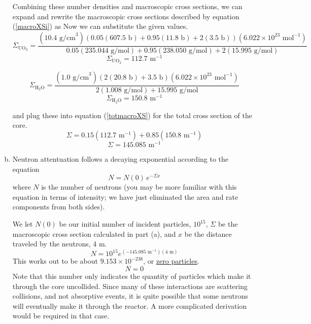 \documentclass{report}
\begin{document}
\begin{enumerate}[a)]
Combining these number densities and macroscopic cross sections, we can expand and rewrite the macroscopic cross sections described by equation (\ref{macroXSi}) as
Now we can substitute the given values. 
$$ \Sigma_{\text{UO}_2} = \frac{\left(10.4\text{ g/cm}^3\right) \left(0.05(607.5\text{ b}) + 0.95(11.8\text{ b})  + 2(3.5\text{ b})\right)\left(6.022\times10^{23}\text{ mol}^{-1}\right)}{0.05(235.044\text{ g/mol}) + 0.95(238.050\text{ g/mol}) + 2(15.995\text{ g/mol})} $$
$$ \Sigma_{\text{UO}_2} = 112.7\text{ m}^{-1} $$

$$ \Sigma_{\text{H}_2\text{O}} = \frac{\left(1.0\text{ g/cm}^3\right) \left(2(20.8\text{ b}) + 3.5\text{ b}\right) \left(6.022\times10^{23}\text{ mol}^{-1}\right)}{2(1.008\text{ g/mol}) + 15.995\text{ g/mol}} $$
$$ \Sigma_{\text{H}_2\text{O}} = 150.8\text{ m}^{-1} $$

and plug these into equation (\ref{totmacroXS}) for the total cross section of the core.
$$ \Sigma = 0.15(112.7\text{ m}^{-1}) + 0.85(150.8\text{ m}^{-1})
 $$
$$\boxed{ \Sigma = 145.085\text{ m}^{-1} }$$

\item 

Neutron attentuation follows a decaying exponential according to the equation
$$ N = N(0) \, e^{-\Sigma x} $$
where $N$ is the number of neutrons (you may be more familiar with this equation in terms of intensity; we have just eliminated the area and rate components from both sides).

We let $N(0)$ be our initial number of incident particles, $10^{15}$, $\Sigma$ be the macroscopic cross section calculated in part (a), and $x$ be the distance traveled by the neutrons, 4 m.  
$$ N = 10^{15} e^{(-145.085\text{ m}^{-1})(4\text{ m})} $$
This works out to be about $9.153\times10^{-238}$, or \underline{zero particles}.
$$ N = 0 $$
Note that this number only indicates the quantity of particles which make it through the core uncollided. Since many of these interactions are scattering collisions, and not absorptive events, it is quite possible that some neutrons will eventually make it through the reactor. A more complicated derivation would be required in that case.
\end{enumerate}
\end{document}
